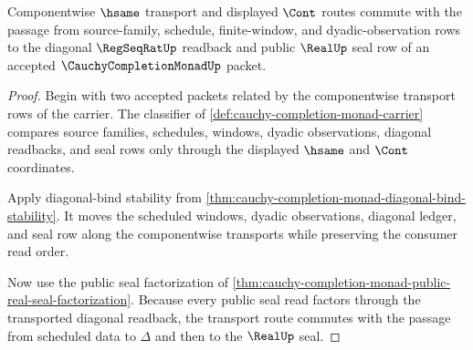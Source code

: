 \begin{theorem}
\label{thm:cauchy-completion-monad-real-seal-naturality}
Componentwise $\hsame$ transport and displayed $\Cont$ routes commute with the passage from source-family, schedule, finite-window, and dyadic-observation rows to the diagonal $\RegSeqRatUp$ readback and public $\RealUp$ seal row of an accepted $\CauchyCompletionMonadUp$ packet.
\end{theorem}
\begin{proof}
Begin with two accepted packets related by the componentwise transport rows of the carrier. The classifier of \autoref{def:cauchy-completion-monad-carrier} compares source families, schedules, windows, dyadic observations, diagonal readbacks, and seal rows only through the displayed $\hsame$ and $\Cont$ coordinates.

Apply diagonal-bind stability from \autoref{thm:cauchy-completion-monad-diagonal-bind-stability}. It moves the scheduled windows, dyadic observations, diagonal ledger, and seal row along the componentwise transports while preserving the consumer read order.

Now use the public seal factorization of \autoref{thm:cauchy-completion-monad-public-real-seal-factorization}. Because every public seal read factors through the transported diagonal readback, the transport route commutes with the passage from scheduled data to $\Delta$ and then to the $\RealUp$ seal.
\end{proof}


